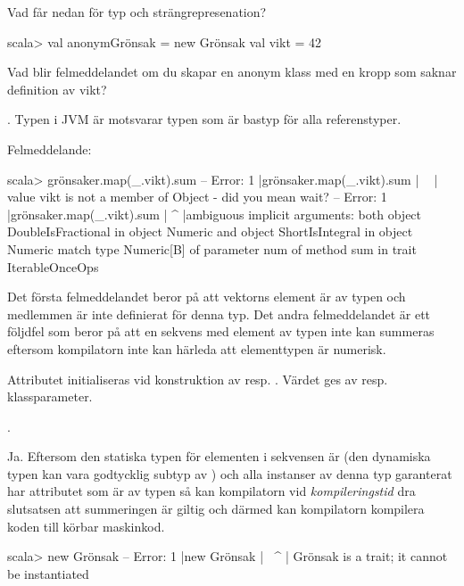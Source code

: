 Vad får  nedan för typ och strängrepresenation?
\begin{REPL}
scala> val anonymGrönsak = new Grönsak { val vikt = 42 }
\end{REPL}

\Subtask Vad blir felmeddelandet om du skapar en anonym klass  med en kropp som saknar definition av vikt?

\SOLUTION


\TaskSolved \what


\SubtaskSolved  {}. Typen  i JVM är motsvarar typen  som är bastyp för alla referenstyper.

\SubtaskSolved  Felmeddelande:
\begin{REPLnonum}
scala> grönsaker.map(_.vikt).sum  
-- Error:                                                                                 
1 |grönsaker.map(_.vikt).sum
  |              ^^^^^^
  |             value vikt is not a member of Object - did you mean wait?
-- Error:
1 |grönsaker.map(_.vikt).sum
  |                         ^
  |ambiguous implicit arguments: both object DoubleIsFractional in object Numeric and object ShortIsIntegral in object Numeric match type Numeric[B] of parameter num of method sum in trait IterableOnceOps
\end{REPLnonum}
Det första felmeddelandet beror på att vektorns element är av typen  och medlemmen  är inte definierat för denna typ. Det andra felmeddelandet är ett följdfel som beror på att en sekvens med element av typen  inte kan summeras eftersom kompilatorn inte kan härleda att elementtypen är numerisk.

\SubtaskSolved  Attributet  initialiseras vid konstruktion av  resp. . Värdet ges av resp. klassparameter.

\SubtaskSolved  {}.

\SubtaskSolved  Ja. Eftersom den statiska typen för elementen i sekvensen är  (den dynamiska typen kan vara godtycklig subtyp av ) och alla instanser av denna typ garanterat har attributet  som är av typen  så kan kompilatorn vid \emph{kompileringstid} dra slutsatsen att summeringen är giltig och därmed kan kompilatorn kompilera koden till körbar maskinkod.

\SubtaskSolved  
\begin{REPLnonum}
scala> new Grönsak
-- Error:
1 |new Grönsak
  |    ^^^^^^^
  |    Grönsak is a trait; it cannot be instantiated
\end{REPLnonum}

